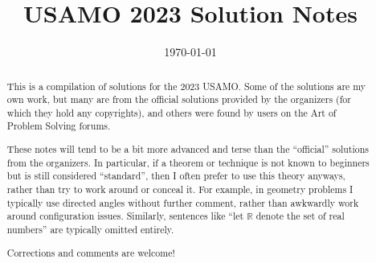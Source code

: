\documentclass[11pt]{scrartcl}
\title{USAMO 2023 Solution Notes}
\date{\today}
\begin{document}
\maketitle

\begin{abstract}
This is a compilation of solutions
for the 2023 USAMO.
Some of the solutions are my own work,
but many are from the official solutions provided by the organizers
(for which they hold any copyrights),
and others were found by users on the Art of Problem Solving forums.

These notes will tend to be a bit more advanced and terse than the ``official''
solutions from the organizers.
In particular, if a theorem or technique is not known to beginners
but is still considered ``standard'', then I often prefer to
use this theory anyways, rather than try to work around or conceal it.
For example, in geometry problems I typically use directed angles
without further comment, rather than awkwardly work around configuration issues.
Similarly, sentences like ``let $\mathbb{R}$ denote the set of real numbers''
are typically omitted entirely.

Corrections and comments are welcome!
\end{abstract}

\tableofcontents
\newpage

\addtocounter{section}{-1}
\end{document}

